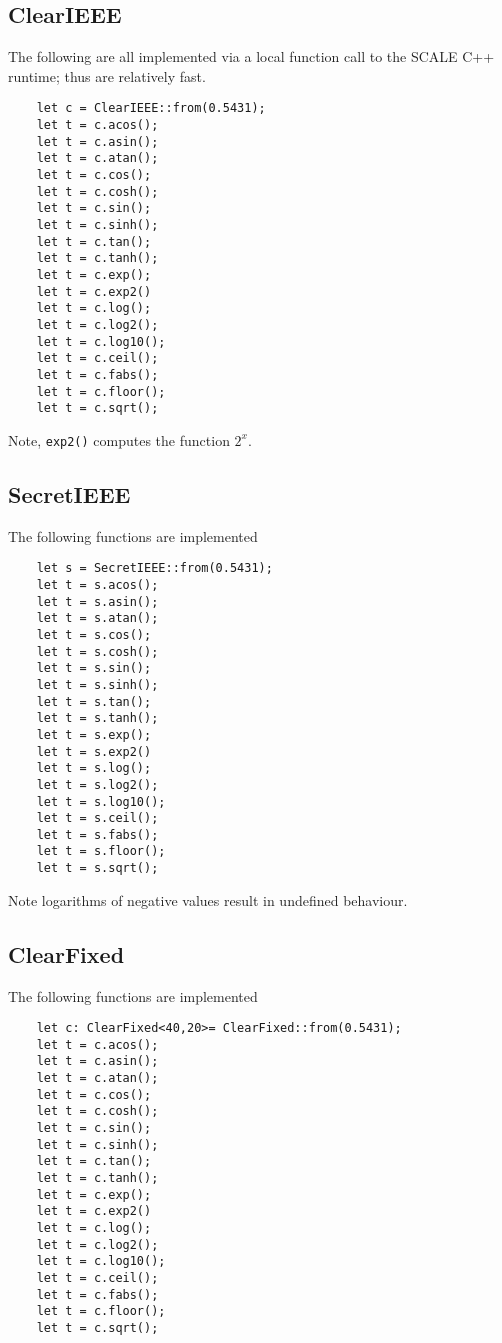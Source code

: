 \subsection{ClearIEEE}
The following are all implemented via a local function call
to the SCALE C++ runtime; thus are relatively fast.
\begin{lstlisting}
    let c = ClearIEEE::from(0.5431);
    let t = c.acos();
    let t = c.asin();
    let t = c.atan();
    let t = c.cos();
    let t = c.cosh();
    let t = c.sin();
    let t = c.sinh();
    let t = c.tan();
    let t = c.tanh();
    let t = c.exp();
    let t = c.exp2()
    let t = c.log();
    let t = c.log2();
    let t = c.log10();
    let t = c.ceil();
    let t = c.fabs();
    let t = c.floor();
    let t = c.sqrt();
\end{lstlisting}
Note, \verb|exp2()| computes the function $2^x$.

\subsection{SecretIEEE}
The following functions are implemented
\begin{lstlisting}
    let s = SecretIEEE::from(0.5431);
    let t = s.acos();
    let t = s.asin();
    let t = s.atan();
    let t = s.cos();
    let t = s.cosh();
    let t = s.sin();
    let t = s.sinh();
    let t = s.tan();
    let t = s.tanh();
    let t = s.exp();
    let t = s.exp2()
    let t = s.log();
    let t = s.log2();
    let t = s.log10();
    let t = s.ceil();
    let t = s.fabs();
    let t = s.floor();
    let t = s.sqrt();
\end{lstlisting}
Note logarithms of negative values result in undefined
behaviour.

\subsection{ClearFixed}
The following functions are implemented
\begin{lstlisting}
    let c: ClearFixed<40,20>= ClearFixed::from(0.5431);
    let t = c.acos();
    let t = c.asin();
    let t = c.atan();
    let t = c.cos();
    let t = c.cosh();
    let t = c.sin();
    let t = c.sinh();
    let t = c.tan();
    let t = c.tanh();
    let t = c.exp();
    let t = c.exp2()
    let t = c.log();
    let t = c.log2();
    let t = c.log10();
    let t = c.ceil();
    let t = c.fabs();
    let t = c.floor();
    let t = c.sqrt();
\end{lstlisting}

